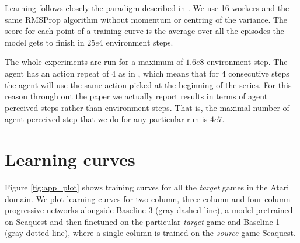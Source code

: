 \documentclass{article}
\begin{document}
Learning follows closely the paradigm described in \citep{mnih2016a3c}. We use 16 workers and the
same RMSProp algorithm without momentum or centring of the variance. The score for each point of
a training curve is the average over all the episodes the model gets to finish in $25e4$ environment steps.

The whole experiments are run for a maximum of $1.6e8$ environment step. The agent has an action repeat of 4 as
in \cite{mnih2016a3c}, which means that for 4 consecutive steps the agent will use the same action picked at the
beginning of the series. For this reason through out the paper we actually report results in terms of agent
perceived steps rather than environment steps. That is, the maximal number of agent perceived step that we do
for any particular run is $4e7$.



\section{Learning curves}
\label{sec:appendix_curves}

Figure \ref{fig:app_plot} shows training curves for all the \textit{target} games in the Atari domain.
We plot learning curves for two column, three column and four column progressive networks alongside Baseline 3 (gray dashed line), a model pretrained on Seaquest and then finetuned on the particular \textit{target} game and Baseline 1 (gray dotted line), where a single column is trained on the \textit{source} game Seaquest.
\end{document}

